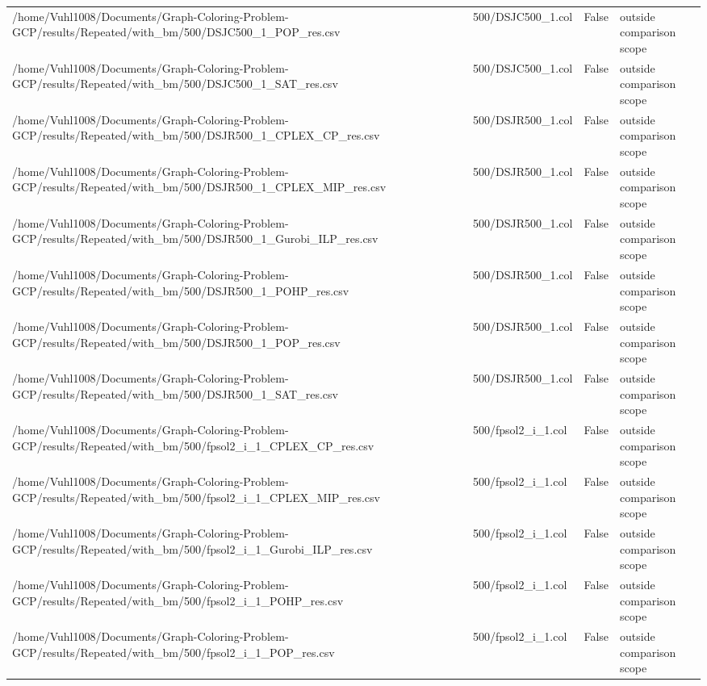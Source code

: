 \begin{table}[htbp]
\begin{tabular}{llll}
/home/Vuhl1008/Documents/Graph-Coloring-Problem-GCP/results/Repeated/with\_bm/500/DSJC500\_1\_POP\_res.csv & 500/DSJC500\_1.col & False & outside comparison scope \\
/home/Vuhl1008/Documents/Graph-Coloring-Problem-GCP/results/Repeated/with\_bm/500/DSJC500\_1\_SAT\_res.csv & 500/DSJC500\_1.col & False & outside comparison scope \\
/home/Vuhl1008/Documents/Graph-Coloring-Problem-GCP/results/Repeated/with\_bm/500/DSJR500\_1\_CPLEX\_CP\_res.csv & 500/DSJR500\_1.col & False & outside comparison scope \\
/home/Vuhl1008/Documents/Graph-Coloring-Problem-GCP/results/Repeated/with\_bm/500/DSJR500\_1\_CPLEX\_MIP\_res.csv & 500/DSJR500\_1.col & False & outside comparison scope \\
/home/Vuhl1008/Documents/Graph-Coloring-Problem-GCP/results/Repeated/with\_bm/500/DSJR500\_1\_Gurobi\_ILP\_res.csv & 500/DSJR500\_1.col & False & outside comparison scope \\
/home/Vuhl1008/Documents/Graph-Coloring-Problem-GCP/results/Repeated/with\_bm/500/DSJR500\_1\_POHP\_res.csv & 500/DSJR500\_1.col & False & outside comparison scope \\
/home/Vuhl1008/Documents/Graph-Coloring-Problem-GCP/results/Repeated/with\_bm/500/DSJR500\_1\_POP\_res.csv & 500/DSJR500\_1.col & False & outside comparison scope \\
/home/Vuhl1008/Documents/Graph-Coloring-Problem-GCP/results/Repeated/with\_bm/500/DSJR500\_1\_SAT\_res.csv & 500/DSJR500\_1.col & False & outside comparison scope \\
/home/Vuhl1008/Documents/Graph-Coloring-Problem-GCP/results/Repeated/with\_bm/500/fpsol2\_i\_1\_CPLEX\_CP\_res.csv & 500/fpsol2\_i\_1.col & False & outside comparison scope \\
/home/Vuhl1008/Documents/Graph-Coloring-Problem-GCP/results/Repeated/with\_bm/500/fpsol2\_i\_1\_CPLEX\_MIP\_res.csv & 500/fpsol2\_i\_1.col & False & outside comparison scope \\
/home/Vuhl1008/Documents/Graph-Coloring-Problem-GCP/results/Repeated/with\_bm/500/fpsol2\_i\_1\_Gurobi\_ILP\_res.csv & 500/fpsol2\_i\_1.col & False & outside comparison scope \\
/home/Vuhl1008/Documents/Graph-Coloring-Problem-GCP/results/Repeated/with\_bm/500/fpsol2\_i\_1\_POHP\_res.csv & 500/fpsol2\_i\_1.col & False & outside comparison scope \\
/home/Vuhl1008/Documents/Graph-Coloring-Problem-GCP/results/Repeated/with\_bm/500/fpsol2\_i\_1\_POP\_res.csv & 500/fpsol2\_i\_1.col & False & outside comparison scope \\

\end{tabular}
\end{table}
